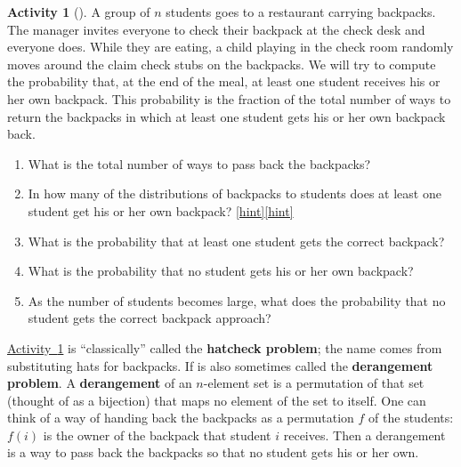 \documentclass[10pt,]{book}
\newcommand{\terminology}[1]{\textbf{#1}}
\theoremstyle{plain}
\theoremstyle{definition}
\theoremstyle{definition}
\theoremstyle{definition}
\newtheorem{activity}[project]{Activity}
\numberwithin{equation}{chapter}
\begin{document}
\begin{activity}[]\label{hatcheck}
\hypertarget{p-1183}{}%
A group of \(n\) students goes to a restaurant carrying backpacks. The manager invites everyone to check their backpack at the check desk and everyone does. While they are eating, a child playing in the check room randomly moves around the claim check stubs on the backpacks. We will try to compute the probability that, at the end of the meal, at least one student receives his or her own backpack.  This probability is the fraction of the total number of ways to return the backpacks in which at least one student gets his or her own backpack back.%
\begin{enumerate}[font=\bfseries,label=(\alph*),ref=\alph*]
\item\label{task-225} \hypertarget{p-1184}{}%
What is the total number of ways to pass back the backpacks?%
\item\label{task-226} \hypertarget{p-1186}{}%
In how many of the distributions of backpacks to students does at least one student get his or her own backpack?%
\hfill{\tiny\hyperlink{a-222.b}{[hint]}\hypertarget{q-222.b}{}}\hfill{\tiny\hyperlink{a-222.b}{[hint]}\hypertarget{q-222.b}{}}\item\label{task-227} \hypertarget{p-1190}{}%
What is the probability that at least one student gets the correct backpack?%
\item\label{hatcheckprobpart} \hypertarget{p-1192}{}%
What is the probability that no student gets his or her own backpack?%
\item\label{task-229} \hypertarget{p-1194}{}%
As the number of students becomes large, what does the probability that no student gets the correct backpack approach?%
\end{enumerate}
\end{activity}
\hypertarget{p-1196}{}%
\hyperref[hatcheck]{Activity~\ref{hatcheck}} is ``classically'' called the \terminology{hatcheck problem}; the name comes from substituting hats for backpacks. If is also sometimes called the \terminology{derangement problem}. A \terminology{derangement} of an \(n\)-element set is a permutation of that set (thought of as a bijection) that maps no element of the set to itself. One can think of a way of handing back the backpacks as a permutation \(f\) of the students: \(f(i)\) is the owner of the backpack that student \(i\) receives. Then a derangement is a way to pass back the backpacks so that no student gets his or her own.%
\typeout{************************************************}
\typeout{************************************************}
\end{document}
